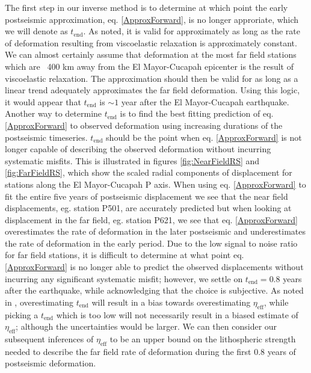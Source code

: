 \documentclass[12pt]{article}
\begin{document}
The first step in our inverse method is to determine at which point the early postseismic approximation, eq. \ref{ApproxForward}, is no longer approriate, which we will denote as $t_{\mathrm{end}}$.  As noted, it is valid for approximately as long as the rate of deformation resulting from viscoelastic relaxation is approximately constant. We can almost certainly assume that deformation at the most far field stations which are ~400 km away from the El Mayor-Cucapah epicenter is the result of viscoelastic relaxation. The approximation should then be valid for as long as a linear trend adequately approximates the far field deformation. Using this logic, it would appear that $t_{\mathrm{end}}$ is $\sim1$ year after the El Mayor-Cucapah earthquake.  Another way to determine $t_{\mathrm{end}}$ is to find the best fitting prediction of eq. \ref{ApproxForward} to observed deformation using increasing durations of the postseismic timeseries.  $t_\mathrm{end}$ should be the point when eq. \ref{ApproxForward} is not longer capable of describing the observed deformation without incurring systematic misfits.  This is illustrated in figures \ref{fig:NearFieldRS} and \ref{fig:FarFieldRS}, which show the scaled radial components of displacement for stations along the El Mayor-Cucapah P axis.  When using eq. \ref{ApproxForward} to fit the entire five years of postseismic displacement we see that the near field displacements, eg. station P501, are accurately predicted but when looking at displacement in the far field, eg. station P621, we see that eq. \ref{ApproxForward} overestimates the rate of deformation in the later postseismic and underestimates the rate of deformation in the early period.  Due to the low signal to noise ratio for far field stations, it is difficult to determine at what point eq. \ref{ApproxForward} is no longer able to predict the observed displacements without incurring any significant systematic misfit; however, we settle on $t_{\mathrm{end}}=0.8$ years after the earthquake, while acknowledging that the choice is subjective. As noted in \cite{Hines2015}, overestimating $t_{\mathrm{end}}$ will result in a bias towards overestimating $\eta_{\mathrm{eff}}$, while picking a $t_\mathrm{end}$ which is too low will not necessarily result in a biased estimate of $\eta_\mathrm{eff}$; although the uncertainties would be larger. We can then consider our subsequent inferences of $\eta_{\mathrm{eff}}$ to be an upper bound on the lithospheric strength needed to describe the far field rate of deformation during the first 0.8 years of postseismic deformation. 
\end{document}
